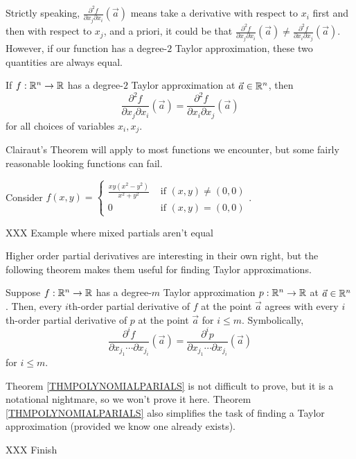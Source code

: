 Strictly speaking, $\frac{\partial^2 f}{\partial x_j\partial x_i}(\vec a)$ means take a derivative
with respect to $x_i$ first and then with respect to $x_j$, and a priori, it could be that
$\frac{\partial^2 f}{\partial x_j\partial x_i}(\vec a)\neq \frac{\partial^2 f}{\partial x_i\partial x_j}(\vec a)$.
However, if our function has a degree-$2$ Taylor approximation, these two quantities are
always equal.
\begin{theorem}
	If $f:\mathbb{R}^n\to\mathbb{R}$ has a degree-$2$ Taylor approximation at $\vec a\in\mathbb{R}^n$, then
	\[
\frac{\partial^2 f}{\partial x_j\partial x_i}(\vec a)= \frac{\partial^2 f}{\partial x_i\partial x_j}(\vec a)
	\]
	for all choices of variables $x_i,x_j$.
\end{theorem}

Clairaut's Theorem will apply to most functions we encounter, but
some fairly reasonable looking functions can fail.

\begin{example}
	Consider $f(x,y)=\begin{cases} \frac{xy(x^2-y^2)}{x^2+y^2} &\text{ if } (x,y)\neq (0,0)\\
	0 &\text{ if }(x,y)=(0,0)\end{cases}$.

	XXX Example where mixed partials aren't equal
\end{example}

Higher order partial derivatives are interesting in their own right,
but the following theorem makes them useful for finding Taylor approximations.

\begin{theorem}
	\label{THMPOLYNOMIALPARIALS}
	Suppose $f:\mathbb{R}^n\to\mathbb{R}$ has a degree-$m$ Taylor approximation $p:\mathbb{R}^n\to\mathbb{R}$
	at $\vec a\in\mathbb{R}^n$.
	Then, every $i$th-order partial derivative of $f$ at the point $\vec a$
	agrees with every $i$th-order
	partial derivative of $p$ at the point $\vec a$ for $i\leq m$.
	Symbolically,
	\[
		\frac{\partial^i f}{\partial x_{j_1}\cdots \partial x_{j_i}}(\vec a)
		=
		\frac{\partial^i p}{\partial x_{j_1}\cdots \partial x_{j_i}}(\vec a)
	\]
	for $i\leq m$.
\end{theorem}

Theorem \ref{THMPOLYNOMIALPARIALS} is not difficult to prove, but it is a notational
nightmare, so we won't prove it here.  Theorem \ref{THMPOLYNOMIALPARIALS} also
simplifies the task of finding a Taylor approximation (provided we know one already exists).

\begin{example}
	XXX Finish
\end{example}

